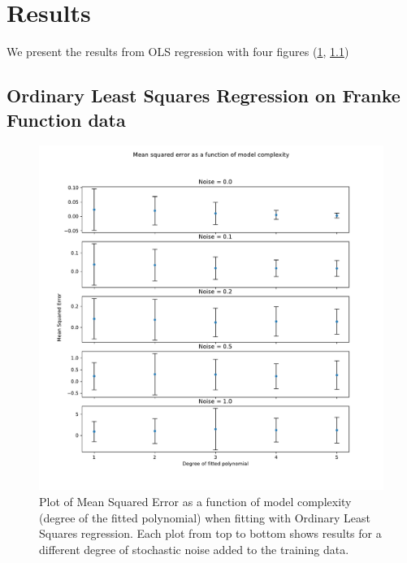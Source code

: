 \section{Results}
We present the results from OLS regression with four figures (\ref{fig:ols-mse-complexity},
\ref{})
\subsection{Ordinary Least Squares Regression on Franke Function data}
\begin{figure}[h]
    \includegraphics[width = 0.8\paperwidth]{figures/mse_vs_complexity_ols.pdf}
    \caption{Plot of Mean Squared Error as a function of model complexity (degree of the
	    fitted polynomial) when fitting with Ordinary Least Squares regression. Each plot
	    from top to bottom shows results for a different degree of stochastic noise added
	    to the training data.}
    \label{fig:ols-mse-complexity}
\end{figure}

